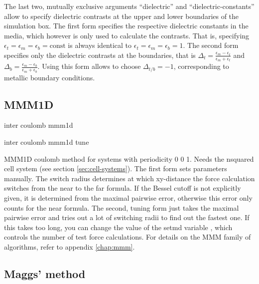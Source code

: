 The last two, mutually exclusive arguments ``dielectric'' and
``dielectric-constants'' allow to specify dielectric contrasts at the
upper and lower boundaries of the simulation box. The first form
specifies the respective dielectric constants in the media, which
however is only used to calculate the contrasts. That is, specifying 
$\epsilon_t=\epsilon_m=\epsilon_b=\text{const}$ is always identical to
$\epsilon_t=\epsilon_m=\epsilon_b=1$. The second form specifies only
the dielectric contrasts at the boundaries, that is
$\Delta_t=\frac{\epsilon_m-\epsilon_t}{\epsilon_m+\epsilon_t}$ and
$\Delta_b=\frac{\epsilon_m-\epsilon_b}{\epsilon_m+\epsilon_b}$. Using
this form allows to choose $\Delta_{t/b}=-1$, corresponding to
metallic boundary conditions.

\subsection{MMM1D}

\begin{essyntax}
  inter coulomb  mmm1d 
   

  inter coulomb  mmm1d tune 
  \begin{features}
  \end{features}
\end{essyntax}
MMM1D coulomb method for systems with periodicity 0 0 1. Needs the
nsquared cell system (see section \vref{sec:cell-systems}). The first
form sets parameters manually. The switch radius determines at which
xy-distance the force calculation switches from the near to the far
formula. If the Bessel cutoff is not explicitly given, it is
determined from the maximal pairwise error, otherwise this error only
counts for the near formula. The second, tuning form just takes the
maximal pairwise error and tries out a lot of switching radii to find
out the fastest one. If this takes too long, you can change the value
of the setmd variable , which controls the number of
test force calculations. For details on the MMM family of algorithms,
refer to appendix \vref{chap:mmm}.

\subsection{Maggs' method}

